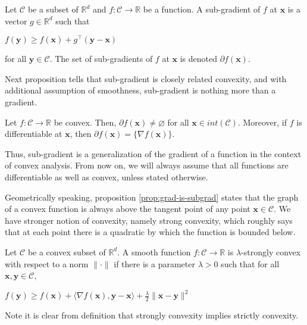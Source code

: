 \documentclass[12pt, a4paper]{report}
\begin{document}
\begin{defn}
Let $\mathcal{C}$ be a subset of $\mathbb{R}^d$ and $f: \mathcal{C} \rightarrow \mathbb{R}$ be a function. A sub-gradient of $f$ at $\mathbf{x}$ is a vector $g \in \mathbb{R}^d$ such that
\begin{center}
    $f(\mathbf{y}) \geq f(\mathbf{x}) + g^\top(\mathbf{y} - \mathbf{x})$
\end{center}
for all $\mathbf{y} \in \mathcal{C}$. The set of sub-gradients of $f$ at $\mathbf{x}$ is denoted $ \partial f(\mathbf{x})$.
\end{defn}

Next proposition tells that sub-gradient is closely related convexity, and with additional assumption of smoothness, sub-gradient is nothing more than a gradient.
\begin{prop} \label{prop:grad-is-subgrad}
Let $f: \mathcal{C} \rightarrow \mathbb{R}$ be convex. Then, $\partial f(\mathbf{x}) \neq \varnothing$ for all $\mathbf{x} \in int(\mathcal{C})$. Moreover, if $f$ is differentiable at $\mathbf{x}$, then $\partial f(\mathbf{x}) = \{\nabla f(\mathbf{x})\}$.
\end{prop}
Thus, sub-gradient is a generalization of the gradient of a function in the context of convex analysis. From now on, we will always assume that all functions are differentiable as well as convex, unless stated otherwise.  

Geometrically speaking, proposition \ref{prop:grad-is-subgrad} states that the graph of a convex function is always above the tangent point of any point $\mathbf{x} \in \mathcal{C}$. We have stronger notion of convexity, namely strong convexity, which roughly says that at each point there is a quadratic by which the function is bounded below. 
\begin{defn}
Let $\mathcal{C}$ be a convex subset of $\mathbb{R}^d$. A smooth function $f : \mathcal{C} \rightarrow \mathbb{R}$ is $\lambda$-strongly convex with respect to a norm $\lVert \cdot \rVert$ if there is a parameter $\lambda > 0$ such that for all $\mathbf{x}, \mathbf{y} \in \mathcal{C}$, 
\begin{center}
    $\displaystyle f(\mathbf{y}) \geq f(\mathbf{x}) + \langle \nabla f(\mathbf{x}), \mathbf{y} - \mathbf{x} \rangle + \frac{\lambda}{2}\lVert \mathbf{x} - \mathbf{y} \rVert^2$
\end{center}
\end{defn}
Note it is clear from definition that strongly convexity implies strictly convexity.
\end{document}
